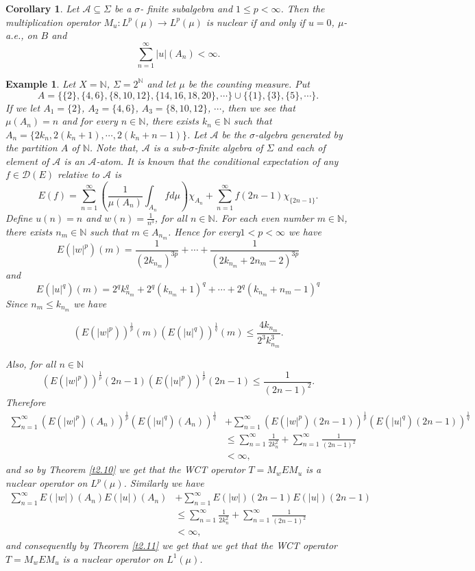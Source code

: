 \documentclass{amsart}
\newtheorem{cor}[thm]{Corollary}
\newtheorem{exam}[thm]{Example}
\theoremstyle{definition}\newtheorem{defn}[thm]{Definition}
\theoremstyle{remark}
\numberwithin{equation}{section}
\begin{document}
\begin{cor}
Let $\mathcal{A}\subseteq \Sigma$ be a $\sigma$- finite subalgebra and $1\leq p<\infty$. Then the multiplication operator $M_u:L^p(\mu)\rightarrow L^p(\mu)$ is nuclear if and only if 
$u=0$, $\mu$-a.e., on $B$ and 
$$\sum^{\infty}_{n=1}|u|(A_n)<\infty.$$

\end{cor}
\begin{exam}
Let $X=\mathbb{N}$,
$\Sigma=2^{\mathbb{N}}$ and let $\mu$ be the counting measure. Put
$$A=\{\{2\},\{4,6\},
\{8,10,12\},\{14,16,18,20\},\cdots\}\cup\{\{1\}, \{3\}, \{5\},
\cdots \}.$$
If we let $A_{1}=\{2\}$, $A_{2}=\{4,6\}$,
$A_{3}=\{8,10,12\}$, $\cdots$, then we see that $\mu(A_{n})=n$
and for every $n\in \mathbb{N}$, there exists $k_{n}\in
\mathbb{N}$ such that $A_{n}=\{2k_{n}, 2(k_{n}+1), \cdots,
2(k_{n}+n-1)\}$. Let $\mathcal{A}$ be the $\sigma$-algebra
generated by the partition $A$ of $\mathbb{N}$. Note that,
$\mathcal{A}$ is a sub-$\sigma$-finite algebra of $\Sigma$ and
each of element of $\mathcal{A}$ is an $\mathcal{A}$-atom. It is
known that the conditional expectation of any  $f\in
\mathcal{D}(E)$ relative to $\mathcal{A}$ is
$$E(f)=\sum_{n=1}^{\infty}\left(\frac{1}{\mu(A_n)}\int_{A_n}fd\mu\right)\chi_{A_n}+
\sum_{n=1}^{\infty}f(2n-1)\chi_{\{2n-1\}}.$$
Define $u(n)=n$ and $w(n)=\frac{1}{n^{3}}$, for all $n\in \mathbb{N}$.
For each even number $m\in \mathbb{N}$, there exists $n_{m}\in \mathbb{N}$ such that
$m\in A_{n_{m}}$. Hence for every$ 1< p<\infty$ we have
$$E(|w|^p)(m)=\frac{1}{(2k_{n_m})^{3p}}+\cdots
+\frac{1}{(2k_{n_m}+2n_m-2)^{3p}}$$
and
$$E(|u|^{q})(m)=2^qk^q_{n_m}+2^q(k_{n_m}+1)^q+ \cdots+
2^q(k_{n_m}+n_m-1)^q$$
Since $n_m\leq k_{n_m}$ we have

$$(E(|w|^p))^{\frac{1}{p}}(m)(E(|u|^{q}))^{\frac{1}{q}}(m)\leq\frac{4k_{n_m}}{2^3k^3_{n_m}}.$$

Also, for all $n\in \mathbb{N}$
$$(E(|w|^p))^{\frac{1}{p}}(2n-1)(E(|u|^{p}))^{\frac{1}{p}}(2n-1)\leq
\frac{1}{(2n-1)^2}.$$
Therefore 
\begin{align*}
\sum^{\infty}_{n=1}(E(|w|^{p})(A_n))^{\frac{1}{p}}(E(|u|^{q})(A_n))^{\frac{1}{q}}&+\sum^{\infty}_{n=1}(E(|w|^{p})(2n-1))^{\frac{1}{p}}(E(|u|^{q})(2n-1))^{\frac{1}{q}}\\
&\leq \sum^{\infty}_{n=1}\frac{1}{2k^2_{n}}+\sum^{\infty}_{n=1}\frac{1}{(2n-1)^2}\\
&<\infty,
\end{align*}
and so by Theorem \ref{t2.10} we get that the WCT operator $T=M_wEM_u$ is a nuclear operator on $L^p(\mu)$. Similarly we have
\begin{align*}
\sum^{\infty}_{n=1}E(|w|)(A_n)E(|u|)(A_n)&+\sum^{\infty}_{n=1}E(|w|)(2n-1)E(|u|)(2n-1)\\
&\leq \sum^{\infty}_{n=1}\frac{1}{2k^2_{n}}+\sum^{\infty}_{n=1}\frac{1}{(2n-1)^2}\\
&<\infty,
\end{align*}
and consequently by Theorem \ref{t2.11} we get that we get that the WCT operator $T=M_wEM_u$ is a nuclear operator on $L^1(\mu)$.

\end{exam}
\end{document}
